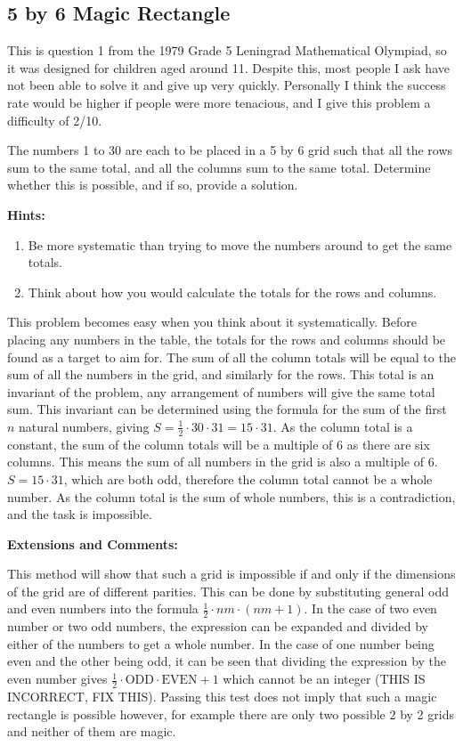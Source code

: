 
\subsection{5 by 6 Magic Rectangle}

This is question 1 from the 1979 Grade 5 Leningrad Mathematical Olympiad\cite{Grade5LeningradOlympiad}, so it was designed for children aged around 11. Despite this, most people I ask have not been able to solve it and give up very quickly. Personally I think the success rate would be higher if people were more tenacious, and I give this problem a difficulty of 2/10.

The numbers 1 to 30 are each to be placed in a 5 by 6 grid such that all the rows sum to the same total, and all the columns sum to the same total. Determine whether this is possible, and if so, provide a solution.

\textbf{Hints:}

\begin{enumerate}
	\item Be more systematic than trying to move the numbers around to get the same totals.
	\item Think about how you would calculate the totals for the rows and columns.
\end{enumerate}

This problem becomes easy when you think about it systematically. Before placing any numbers in the table, the totals for the rows and columns should be found as a target to aim for. The sum of all the column totals will be equal to the sum of all the numbers in the grid, and similarly for the rows. This total is an invariant of the problem, any arrangement of numbers will give the same total sum. This invariant can be determined using the formula for the sum of the first $n$ natural numbers, giving $S = \frac{1}{2} \cdot 30 \cdot 31 = 15 \cdot 31$. As the column total is a constant, the sum of the column totals will be a multiple of 6 as there are six columns. This means the sum of all numbers in the grid is also a multiple of 6. $S = 15 \cdot 31$, which are both odd, therefore the column total cannot be a whole number. As the column total is the sum of whole numbers, this is a contradiction, and the task is impossible.

\textbf{Extensions and Comments:}

This method will show that such a grid is impossible if and only if the dimensions of the grid are of different parities. This can be done by substituting general odd and even numbers into the formula $\frac{1}{2} \cdot nm  \cdot (nm + 1)$. In the case of two even number or two odd numbers, the expression can be expanded and divided by either of the numbers to get a whole number. In the case of one number being even and the other being odd, it can be seen that dividing the expression by the even number gives $\frac{1}{2} \cdot \text{ODD} \cdot {\text{EVEN} + 1}$ which cannot be an integer (THIS IS INCORRECT, FIX THIS). Passing this test does not imply that such a magic rectangle is possible however, for example there are only two possible 2 by 2 grids and neither of them are magic.